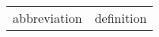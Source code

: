 \documentclass[../../thesis.main.tex]{subfiles}
\begin{document}
\begin{longtable}{ l l }
abbreviation		&	definition\\


\end{longtable}
\end{document}
